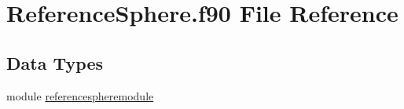 \hypertarget{ReferenceSphere_8f90}{\section{Reference\+Sphere.\+f90 File Reference}
\label{ReferenceSphere_8f90}
}
\subsection*{Data Types}
\begin{DoxyCompactItemize}
\item 
module \hyperlink{classreferencespheremodule}{referencespheremodule}
\end{DoxyCompactItemize}
